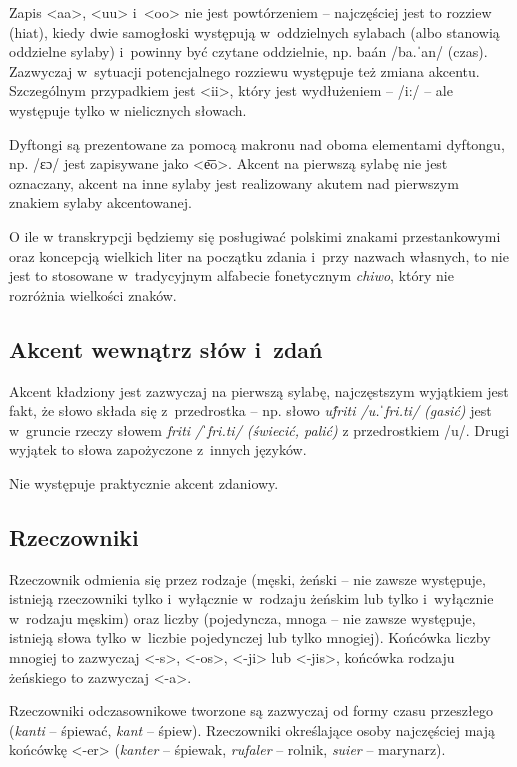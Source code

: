 \begin{spacing}{1.1}
Zapis <aa>, <uu> i~<oo> nie jest powtórzeniem -- najczęściej jest to 
rozziew (hiat), kiedy dwie samogłoski występują w~oddzielnych sylabach (albo 
stanowią oddzielne sylaby) i~powinny być czytane oddzielnie, np. baán /ba.ˈan/
(czas). Zazwyczaj w~sytuacji potencjalnego rozziewu występuje też zmiana 
akcentu. Szczególnym przypadkiem jest <ii>, który jest wydłużeniem -- /i:/ --
ale występuje tylko w nielicznych słowach.

Dyftongi są prezentowane za pomocą makronu nad oboma elementami dyftongu, np.
/ɛɔ/ jest zapisywane jako <e͞o>. Akcent na pierwszą sylabę nie jest oznaczany, 
akcent na inne sylaby jest realizowany akutem nad pierwszym znakiem sylaby 
akcentowanej.

O ile w transkrypcji będziemy się posługiwać polskimi znakami przestankowymi oraz 
koncepcją wielkich liter na początku zdania i~przy nazwach własnych, to nie 
jest to stosowane w~tradycyjnym alfabecie fonetycznym \emph{chiwo}, który nie 
rozróżnia wielkości znaków.

\subsection{Akcent wewnątrz słów i~zdań}

Akcent kładziony jest zazwyczaj na pierwszą sylabę, najczęstszym wyjątkiem jest 
fakt, że słowo składa się z~przedrostka -- np. słowo \emph{uf́riti /u.ˈfri.ti/ 
(gasić)} jest w~gruncie rzeczy słowem \emph{friti /ˈfri.ti/ (świecić, palić)} 
z przedrostkiem /u/. Drugi wyjątek to słowa zapożyczone z~innych języków.

Nie występuje praktycznie akcent zdaniowy.

\subsection{Rzeczowniki}
Rzeczownik odmienia się przez rodzaje (męski, żeński -- nie zawsze występuje, 
istnieją rzeczowniki tylko i~wyłącznie w~rodzaju żeńskim lub tylko i~wyłącznie 
w~rodzaju męskim) oraz liczby (pojedyncza, mnoga -- nie zawsze występuje, 
istnieją słowa tylko w~liczbie pojedynczej lub tylko mnogiej). Końcówka liczby 
mnogiej to zazwyczaj <-s>, <-os>, <-ji> lub <-jis>, końcówka rodzaju żeńskiego 
to zazwyczaj <-a>.

Rzeczowniki odczasownikowe tworzone są zazwyczaj od formy czasu przeszłego 
(\emph{kanti} -- śpiewać, \emph{kant} -- śpiew). Rzeczowniki określające osoby 
najczęściej mają końcówkę <-er> (\emph{kanter} -- śpiewak, \emph{rufaler} -- 
rolnik, \emph{suier} -- marynarz).


\end{spacing}
